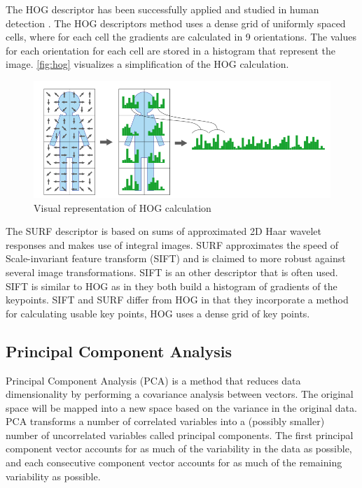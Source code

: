 The HOG descriptor has been successfully applied and studied in human detection \citep{NavneetDalal2006, watanabe2009}. The HOG descriptors method uses a dense grid of uniformly spaced cells, where for each cell the gradients are calculated in 9 orientations. The values for each orientation for each cell are stored in a histogram that represent the image. \autoref{fig:hog} visualizes a simplification of the HOG calculation. 

\begin{figure}[tb]
\center{}
\includegraphics[width=0.8\linewidth]{figures/hog.png}
\caption{Visual representation of HOG calculation}
\label{fig:hog}
\end{figure}


The SURF descriptor is based on sums of approximated 2D Haar wavelet responses and makes use of integral images. SURF approximates the speed of Scale-invariant feature transform (SIFT) and is claimed to more robust against several image transformations\citep{Murillo2007, Valgren2010}. SIFT is an other descriptor that is often used. SIFT is similar to HOG as in they both build a histogram of gradients of the keypoints. SIFT and SURF differ from HOG in that they incorporate a method for calculating usable key points, HOG uses a dense grid of key points.



\subsection{Principal Component Analysis}
Principal Component Analysis (PCA) is a method that reduces data dimensionality by performing a covariance analysis between vectors. The original space will be mapped into a new space based on the variance in the original data. PCA transforms a number of correlated variables into a (possibly smaller) number of uncorrelated variables called principal components. The first principal component vector accounts for as much of the variability in the data as possible, and each consecutive component vector accounts for as much of the remaining variability as possible. 

